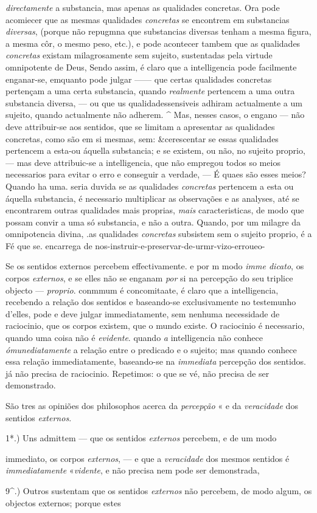 \emph{directamente} a substancia, mas apenas as qualidades concretas. Ora pode acomiecer que as mesmas qualidades \emph{concretas} se encontrem em substancias \emph{diversas}, (porque não repugmna que substancias diversas tenham a mesma figura, a mesma côr, o mesmo peso, etc.), e pode acontecer tambem que as qualidades \emph{concretas} existam milagrosamente sem sujeito, sustentadas pela virtude omnipotente de Deus, Sendo assim, é claro que a intelligencia pode facilmente enganar-se, emquanto pode julgar ------ que certas qualidades concretas pertençam a uma certa substancia, quando \emph{realmente} pertencem a uma outra substancia diversa, --- ou que us qualidadessensiveis adhiram actualmente a um sujeito, quando actualmente não adherem. \textasciicircum{} Mas, nesses casos, o engano --- não deve attribuir-se aos sentidos, que se limitam a apresentar as qualidades concretas, como são em si mesmas, sem: \&cerescentar se essas qualidades pertencem a esta-ou áquella substancia; e se existem, ou não, no sujeito proprio, --- mas deve attribuic-se a intelligencia, que não empregou todos so meios necessarios para evitar o erro e conseguir a verdade, --- É quaes são esses meios? Quando ha uma. seria duvida se as qualidades \emph{concretas} pertencem a esta ou áquella substancia, é necessario multiplicar as observações e as analyses, até se encontrarem outras qualidades mais proprias, \emph{mais} caracteristicas, de modo que possam convir a uma só substancia, e não a outra. Quando, por um milagre da omnipotencia divina, .as qualidades \emph{concretas} subsistem sem o sujeito proprio, é a Fé que se. encarrega de nos-instruir-e-preservar-de-urmr-vizo-erroueo-\par Se os sentidos externos percebem effectivamente. e por m modo \emph{imme dicato}, os corpos \emph{externos}, e se elles não se enganam \emph{por} si na percepção do seu triplice objecto --- \emph{proprio}. conmmum é concomitaate, é claro que a intelligencia, recebendo a relação dos sentidos e baseando-se exclusivamente no testemunho d'elles, pode e deve julgar immediatamente, sem nenhuma necessidade de raciocinio, que os corpos existem, que o mundo existe. O raciocinio é necessario, quando uma coisa não é \emph{evidente}. quando \emph{a} intelligencia não conhece \emph{ómunediatamente} a relação entre o predicado e o sujeito; mas quando conhece essa relação immediatamente, baseando-se na \emph{immediata} percepção dos sentidos. já não precisa de raciocinio. Repetimos: o que se vé, não precisa de ser demonstrado.\par *\par São tres as opiniões dos philosophos acerca da \emph{percepção} « e da \emph{veracidade} dos sentidos \emph{externos}.\par 1*.) Uns admittem --- que os sentidos \emph{externos} \textbar{} percebem, e de um modo\par immediato, os corpos \emph{externos}, --- e que a \emph{veracidade} dos mesmos sentidos é \emph{immediatamente} «\emph{vidente}, e não precisa nem pode ser demonstrada,\par 9\textasciicircum{}.) Outros sustentam que os sentidos \emph{externos} não percebem, de modo algum, os objectos externos; porque estes 